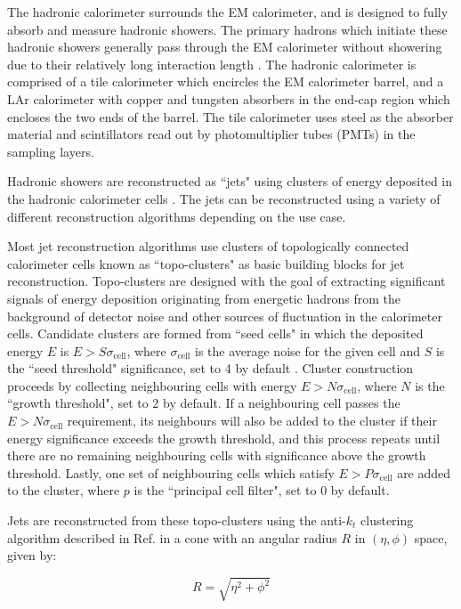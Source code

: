 The hadronic calorimeter surrounds the EM calorimeter, and is designed to fully absorb and measure hadronic showers. The primary hadrons which initiate these hadronic showers generally pass through the EM calorimeter without showering due to their relatively long interaction length \cite{atlas}. The hadronic calorimeter is comprised of a tile calorimeter which encircles the EM calorimeter barrel, and a LAr calorimeter with copper and tungsten absorbers in the end-cap region which encloses the two ends of the barrel. The tile calorimeter uses steel as the absorber material and scintillators read out by photomultiplier tubes (PMTs) in the sampling layers. 

Hadronic showers are reconstructed as ``jets" using clusters of energy deposited in the hadronic calorimeter cells \cite{jet_reco}. The jets can be reconstructed using a variety of different reconstruction algorithms depending on the use case. 

Most jet reconstruction algorithms use clusters of topologically connected calorimeter cells known as ``topo-clusters" as basic building blocks for jet reconstruction. Topo-clusters are designed with the goal of extracting significant signals of energy deposition originating from energetic hadrons from the background of detector noise and other sources of fluctuation in the calorimeter cells. Candidate clusters are formed from ``seed cells" in which the deposited energy \(E\) is \(E>S\sigma_\text{cell}\), where \(\sigma_\text{cell}\) is the average noise for the given cell and \(S\) is the ``seed threshold" significance, set to 4 by default \cite{topo_cell_clustering}. Cluster construction proceeds by collecting neighbouring cells with energy \(E>N\sigma_\text{cell}\), where \(N\) is the ``growth threshold", set to 2 by default. If a neighbouring cell passes the \(E>N\sigma_\text{cell}\) requirement, its neighbours will also be added to the cluster if their energy significance exceeds the growth threshold, and this process repeats until there are no remaining neighbouring cells with significance above the growth threshold. Lastly, one set of neighbouring cells which satisfy \(E>P\sigma_\text{cell}\) are added to the cluster, where \(p\) is the ``principal cell filter", set to 0 by default.

Jets are reconstructed from these topo-clusters using the anti-\(k_t\) clustering algorithm described in Ref. \cite{akt_algo} in a cone with an angular radius \(R\) in \((\eta, \phi)\) space, given by:

\begin{equation}
\label{eq:jet_radius}
R = \sqrt{\eta^2 + \phi^2}
\end{equation}

